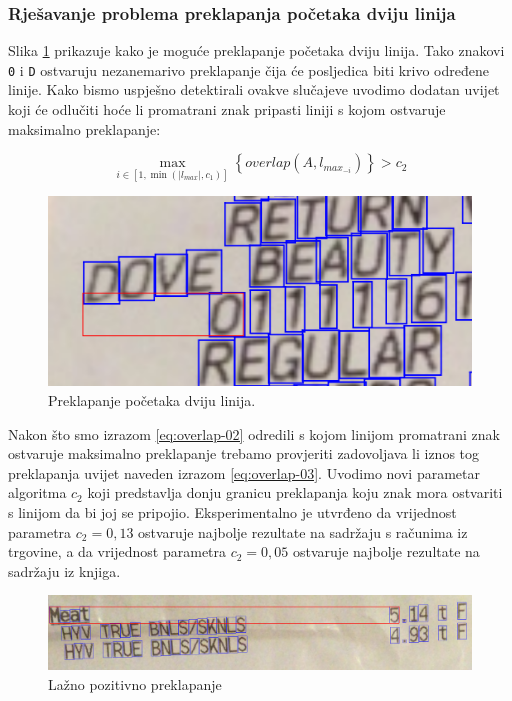 \documentclass[times, utf8, zavrsni]{fer}
\begin{document}
\subsubsection{Rješavanje problema preklapanja početaka dviju linija}
Slika \ref{fig:overlap-01} prikazuje kako je moguće preklapanje početaka dviju
linija. Tako znakovi \lstinline{0} i \lstinline{D}
ostvaruju nezanemarivo preklapanje čija će posljedica biti krivo određene
linije. Kako bismo uspješno detektirali ovakve slučajeve uvodimo dodatan uvijet
koji će odlučiti hoće li promatrani znak pripasti liniji s kojom ostvaruje
maksimalno preklapanje:

\begin{equation}
\label{eq:overlap-03}
\max_{i \in [1, \min(|l_{max}|, c_1)]}\left\{\textit{overlap}(A, l_{max_{-i}})\right\} > c_2
\end{equation}

\begin{figure}[htb]
    \centering
    \captionsetup{justification=centering,margin=2cm}
    \includegraphics[width=\textwidth]{images/overlap-01.png}
    \caption{Preklapanje početaka dviju linija.}
    \label{fig:overlap-01}
\end{figure}

Nakon što smo izrazom \ref{eq:overlap-02} odredili s kojom linijom promatrani
znak ostvaruje maksimalno preklapanje trebamo provjeriti zadovoljava li iznos
tog preklapanja uvijet naveden izrazom \ref{eq:overlap-03}. Uvodimo novi
parametar algoritma $c_2$ koji predstavlja donju granicu preklapanja koju znak
mora ostvariti s linijom da bi joj se pripojio. Eksperimentalno je utvrđeno da
vrijednost parametra $c_2 = 0,13$ ostvaruje najbolje rezultate na sadržaju s
računima iz trgovine, a da vrijednost parametra $c_2 = 0,05$ ostvaruje najbolje
rezultate na sadržaju iz knjiga.

\begin{figure}[htb]
    \centering
    \captionsetup{justification=centering,margin=2cm}
    \includegraphics[width=\textwidth]{images/overlap-02.png}
    \caption{Lažno pozitivno preklapanje}
    \label{fig:overlap-02}
\end{figure}
\end{document}
